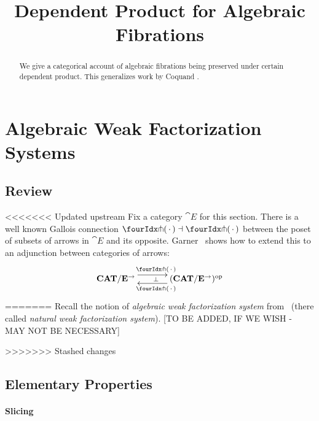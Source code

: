 \documentclass[reqno,10pt,a4paper,oneside]{amsart}
\title{Dependent Product for Algebraic Fibrations}
\begin{document}
\begin{abstract}
We give a categorical account of algebraic fibrations being preserved under certain dependent product.
This generalizes work by Coquand \etal.
\end{abstract}

\maketitle

\tableofcontents

\section{Algebraic Weak Factorization Systems}

\subsection{Review}

<<<<<<< Updated upstream
Fix a category $\cat{E}$ for this section.
There is a well known Gallois connection $\liftr{\brarghole} \dashv \liftl{\brarghole}$ between the poset of subsets of arrows in $\cat{E}$ and its opposite.
Garner~\cite{garner:small-object-argument} shows how to extend this to an adjunction between categories of arrows:
\begin{equation}
\label{garner-adjunction}
\begin{gathered}
\xymatrix@C+1em{
  \CAT/\cat{E}^{\to}
  \ar@<5pt>[r]^{\liftl{\brarghole}}
  \ar@{}[r]|{\bot}
&
  (\CAT/\cat{E}^{\to})^{\op}
  \ar@<5pt>[l]^{\liftr{\brarghole}}
}
\end{gathered}
\end{equation}
=======
Recall the notion of \emph{algebraic weak factorization system} from~\cite{garner:small-object-argument} (there called \emph{natural weak factorization system}). [TO BE ADDED, IF WE WISH - MAY NOT BE NECESSARY] 



>>>>>>> Stashed changes

\subsection{Elementary Properties}





\paragraph{Slicing}
\end{document}
